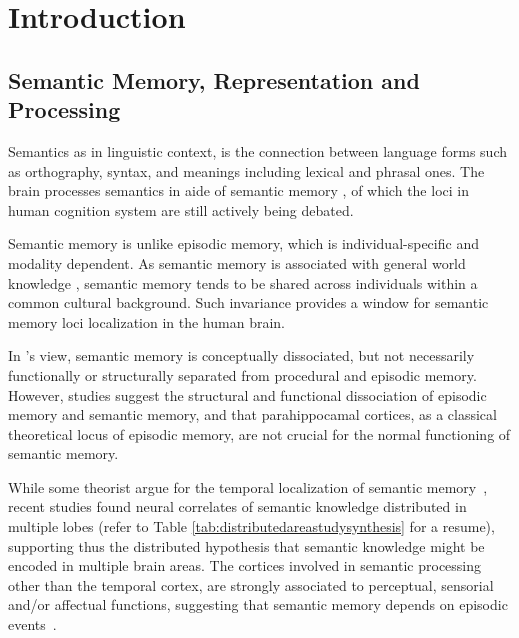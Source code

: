\chapter{Introduction} 

\label{chap:introduction} 

\section{Semantic Memory, Representation and Processing} 

Semantics as in linguistic context, is the connection between language forms such as orthography, syntax, and meanings including lexical and phrasal ones. The brain processes semantics in aide of semantic memory \parencite{tulvingEpisodicSemanticMemory1972}, of which the loci in human cognition system are still actively being debated. 

Semantic memory is unlike episodic memory, which is individual-specific and modality dependent. As semantic memory is associated with general world knowledge \parencite{mcraeSemanticMemory2013}, semantic memory tends to be shared across individuals within a common cultural background. Such invariance provides a window for semantic memory loci localization in the human brain. 

In \citeauthor{tulvingEpisodicSemanticMemory1972}'s view, semantic memory is conceptually dissociated, but not necessarily functionally or structurally separated from procedural and episodic memory. However, studies \parencite{vargha-khademDifferentialEffectsEarly1997} suggest the structural and functional dissociation of episodic memory and semantic memory, and that parahippocamal cortices, as a classical theoretical locus of episodic memory, are not crucial for the normal functioning of semantic memory.
    

While some theorist argue for the temporal localization of semantic memory~\parencite{saumierSemanticMemory2002, martinSemanticMemoryBrain2001}, recent studies found neural correlates of semantic knowledge distributed in multiple lobes (refer to Table \ref{tab:distributedareastudysynthesis} for a resume), supporting thus the distributed hypothesis that semantic knowledge might be encoded in multiple brain areas. The cortices involved in semantic processing other than the temporal cortex, are strongly associated to perceptual, sensorial and\slash or affectual functions, suggesting that semantic memory depends on episodic events~\parencite{moseleyNounsVerbsObjects2014}. 

